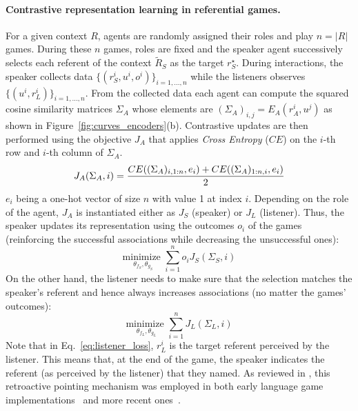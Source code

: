 \paragraph{Contrastive representation learning in referential games. } 
For a given context $R$, agents are randomly assigned their roles and play $n=|R|$ games. During these $n$ games, roles are fixed and the speaker agent successively selects each referent of the context $\tilde{R}_S$ as the target $r^\star_S$. During interactions, the speaker collects data $\{(r_S^i, u^i, o^i)\}_{i=1,...,n}$ while the listeners observes $\{(u^i, r_L^i)\}_{i=1,...,n}$. From the collected data each agent can compute the squared cosine similarity matrices $\Sigma_A$ whose elements are $(\Sigma_A)_{i,j} = E_A(r_A^i, u^j)$ as shown in Figure~\ref{fig:curves_encoders}(b). Contrastive updates are then performed using the objective $J_A$ that applies \textit{Cross Entropy} ($CE$) on the $i$-th row and $i$-th column of $\Sigma_A$.
\begin{equation}
\small
        J_A(\Sigma_A,i) = \frac{CE((\Sigma_A)_{i,1:n},e_i) + CE((\Sigma_A)_{1:n,i},e_i)}{2}\\    
\end{equation}
$e_i$ being a one-hot vector of size $n$ with value 1 at index $i$. Depending on the role of the agent, $J_A$ is instantiated either as $J_S$ (speaker) or $J_L$ (listener). Thus, the speaker updates its representation using the outcomes $o_i$ of the games (reinforcing the successful associations while decreasing the unsuccessful ones):
\begin{equation}
        \underset{\theta_{f_S}, \theta_{g_S}}{\textrm{minimize } } \overset{n}{\underset{i = 1}{\sum}} o_i  J_S(\Sigma_S,i)
\end{equation}
On the other hand, the listener needs to make sure that the selection matches the speaker's referent
\citep{steels2015talkingheads} and hence always increases associations (no matter the games' outcomes):
\begin{equation}
    \underset{\theta_{f_L}, \theta_{g_L}}{\textrm{minimize } } \overset{n}{\underset{i = 1}{\sum}} J_L(\Sigma_L,i)
    \label{eq:listener_loss}
\end{equation}
Note that in Eq.~\ref{eq:listener_loss}, $r_L^i$ is the target referent perceived by the listener. This means that, at the end of the game, the speaker indicates the referent (as perceived by the listener) that they named. As reviewed in , this retroactive pointing mechanism was employed in both early language game implementations~\citep{steels1995self} and more recent ones~\citep{lazaridou2017multiagent,chaabouni2020compositionality,portelance2021emergence}.


